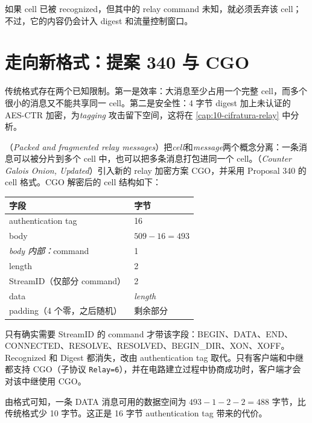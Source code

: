 如果 cell 已被 recognized，但其中的 relay command 未知，就必须丢弃该 cell；不过，它的内容仍会计入 digest 和流量控制窗口。

\section{走向新格式：提案 340 与 CGO}\label{sec:nuovo-formato}

传统格式存在两个已知限制。第一是效率：大消息至少占用一个完整 cell，而多个很小的消息又不能共享同一 cell。第二是安全性：4 字节 digest 加上未认证的 AES-CTR 加密，为\emph{tagging} 攻击留下空间，这将在 \cref{cap:10-cifratura-relay} 中分析。

（\emph{Packed and fragmented relay messages}）把\emph{cell}和\emph{message}两个概念分离：一条消息可以被分片到多个 cell 中，也可以把多条消息打包进同一个 cell。（\emph{Counter Galois Onion, Updated}）引入新的 relay 加密方案 CGO，并采用 Proposal 340 的 cell 格式。CGO 解密后的 cell 结构如下：

\begin{center}
\begin{tabular}{ll}
\toprule
字段 & 字节 \\
\midrule
authentication tag & 16 \\
body & $509 - 16 = 493$ \\
\midrule
\quad \emph{body 内部：}command & 1 \\
\quad length & 2 \\
\quad StreamID（仅部分 command） & 2 \\
\quad data & \emph{length} \\
\quad padding（4 个零，之后随机） & 剩余部分 \\
\bottomrule
\end{tabular}
\end{center}

只有确实需要 StreamID 的 command 才带该字段：BEGIN、DATA、END、CONNECTED、RESOLVE、RESOLVED、BEGIN\_DIR、XON、XOFF。Recognized 和 Digest 都消失，改由 authentication tag 取代。只有客户端和中继都支持 CGO（子协议 \texttt{Relay=6}），并在电路建立过程中协商成功时，客户端才会对该中继使用 CGO。

\begin{approfondimento}
由格式可知，一条 DATA 消息可用的数据空间为 $493 - 1 - 2 - 2 = 488$ 字节，比传统格式少 10 字节。这正是 16 字节 authentication tag 带来的代价。
\end{approfondimento}

